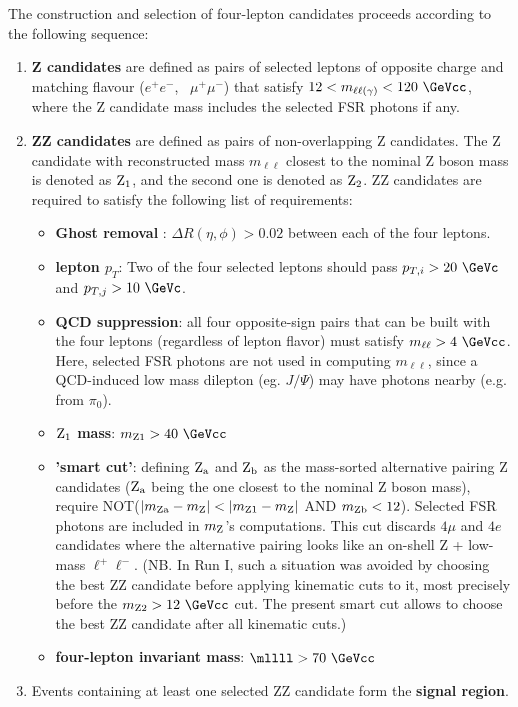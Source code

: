 The construction and selection of four-lepton candidates proceeds 
according to the following sequence:
\begin{enumerate}
\item {\bf Z candidates} are defined as pairs of selected leptons
 of opposite charge and matching flavour ($e^+ e^-$, \, $\mu^+\mu^-$)
 that satisfy $12 < m_{\ell\ell(\gamma)} < 120~\GeVcc$, where the Z candidate mass
 includes the selected FSR photons if any.
\item {\bf ZZ candidates} are defined as pairs of non-overlapping Z candidates.
 The Z candidate with reconstructed mass $m_{\ell\ell}$ closest to the nominal Z boson
 mass is denoted as ${\rm Z_1}$, and the second one is denoted as ${\rm Z_2}$.
 ZZ candidates are required to satisfy the following list of requirements:
  \begin{itemize} 
  \item {\bf Ghost removal }: $\Delta R(\eta,\phi) > 0.02$ between each of the four leptons.
  \item {\bf lepton $p_T$}: Two of the four selected leptons should pass 
     $p_{T,i} > 20~\GeVc$ and $p_{T,j} > 10~\GeVc$.
  \item {\bf QCD suppression}: all four opposite-sign pairs that can
     be built with the four leptons (regardless of lepton flavor)
     must satisfy $m_{\ell\ell} > 4~\GeVcc$.
     Here, selected FSR photons are not used in computing $m_{\ell\ell}$, 
     since a QCD-induced low mass dilepton (eg. $J/\Psi$) 
     may have photons nearby (e.g. from $\pi_0$). 
  \item {\bf ${\rm Z_1}$ mass}: $m_{\rm Z1} > 40~\GeVcc$
  \item {\bf 'smart cut'}: defining ${\rm Z_a}$ and ${\rm Z_b}$ as 
     the mass-sorted alternative pairing Z candidates 
     (${\rm Z_a}$ being the one closest to the nominal Z boson mass),
     require NOT($|m_{\rm Za}-m_{\rm Z}| < |m_{\rm Z1}-m_{\rm Z}|$ AND $m_{\rm Zb}<12$).
     Selected FSR photons are included in $m_{\rm Z}$'s computations.
     This cut discards $4\mu$ and $4e$ candidates where the alternative pairing
     looks like an on-shell Z + low-mass $\ell^+ \ell^-$. 
     (NB. In Run I, such a situation was avoided by choosing the best ZZ candidate
     before applying kinematic cuts to it, most precisely before the $m_{\rm Z2} > 12~\GeVcc$ cut.
     The present smart cut allows to choose the best ZZ candidate after all kinematic cuts.)   
  \item {\bf four-lepton invariant mass}: $\mllll > 70~\GeVcc$
  \end{itemize}	
\item Events containing at least one selected ZZ candidate form the {\bf signal region}.
\end{enumerate}	


